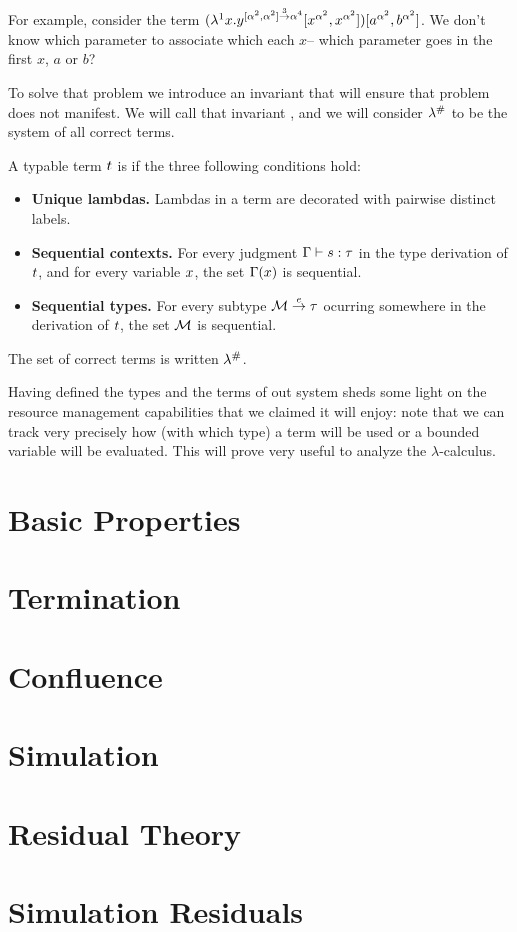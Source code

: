 For example, consider the term
$(\lambda^{1} x. y^{[\alpha^2, \alpha^2] \overset{3}{\to} \alpha^4} [x^{\alpha^2}, x^{\alpha^2}])
[a^{\alpha^2}, b^{\alpha^2}]$.
We don't know which parameter to associate which each $x$-- which parameter goes in the first $x$, $a$ or $b$?

To solve that problem we introduce an invariant that will ensure
that problem does not manifest.
We will call that invariant ,
and we will consider $\lambda^{\mathtt{\#}}$ to be the system of all correct terms.

\begin{definition}
A typable term $t$ is  if the three following conditions hold:
\begin{itemize}
\item {\bf Unique lambdas.}
      Lambdas in a term are decorated with pairwise distinct labels.
\item {\bf Sequential contexts.}
      For every judgment $\Gamma \vdash s : \tau$ in the type derivation of $t$,
      and for every variable $x$, the set $\Gamma(x)$ is sequential.
\item {\bf Sequential types.}
      For every subtype $\mathcal{M} \overset{e}{\to} \tau$ ocurring somewhere in the derivation of $t$,
      the set $\mathcal{M}$ is sequential.
\end{itemize}
The set of correct terms is written $\lambda^{\mathtt{\#}}$.
\end{definition}


Having defined the types and the terms of out system
sheds some light on the resource management capabilities that we claimed it will enjoy:
note that we can track very precisely how (\ie with which type) a term will be used or
a bounded variable will be evaluated.
This will prove very useful to analyze the $\lambda$-calculus.

\section{Basic Properties}

\section{Termination}

\section{Confluence}

\section{Simulation}

\section{Residual Theory}

\section{Simulation Residuals}

